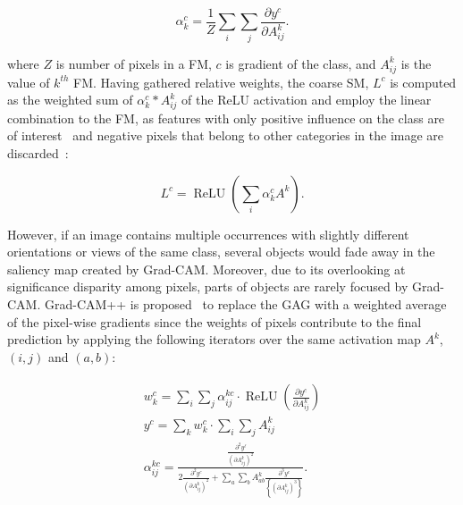 \vspace{-4mm}
\begin{equation}
    \alpha_k^c=\frac{1}{Z}\sum_{i}\sum_{j}\frac{\partial y^c}{\partial A_{ij}^k}.
    \label{eq:alpha}
\end{equation}
\vspace{-4mm}

\hspace*{3.5mm} where $Z$ is number of pixels in a FM, $c$ is gradient of the class, and $A_{ij}^k$ is the value of $k^{th}$ FM. Having gathered relative weights, the coarse SM, $L^c$ is computed as the weighted sum of $\alpha_k^c*A_{ij}^k$ of the ReLU activation and employ the linear combination to the FM, as features with only positive influence on the class are of interest~\cite{chattopadhay2018grad} and negative pixels that belong to other categories in the image are discarded~\cite{114}:

\vspace{-4mm}
\begin{equation}
    L^c=\operatorname{ReLU}(\sum_{i}\alpha_k^cA^k).
    \label{3.11}
\end{equation}
\vspace{-4mm}

\hspace*{3.5mm} However, if an image contains multiple occurrences with slightly different orientations or views of the same class, several objects would fade away in the saliency map created by Grad-CAM. Moreover, due to its overlooking at significance disparity among pixels, parts of objects are rarely focused by Grad-CAM. Grad-CAM++ is proposed~\cite{chattopadhay2018grad} to replace the GAG with a weighted average of the pixel-wise gradients since the weights of pixels contribute to the final prediction by applying the following iterators over the same activation map $A^k$, $(i,j)$ and $(a,b)$:

\vspace{-4mm}
\begin{align}
    \begin{aligned}
        w_{k}^{c}=\sum_{i} \sum_{j} \alpha_{i j}^{k c} \cdot \operatorname{ReLU}\left(\frac{\partial y^{c}}{\partial A_{i j}^{k}}\right) \\
        y^{c}=\sum_{k} w_{k}^{c} \cdot \sum_{i} \sum_{j} A_{i j}^{k} \\
        \alpha_{i j}^{k c}=\frac{\frac{\partial^{2} y^{\ell}}{\left(\partial A_{i j}^{k}\right)^{2}}}{2 \frac{\partial^{2} y^{c}}{\left(\partial A_{i j}^{k}\right)^{2}}+\sum_{a} \sum_{b} A_{a b}^{k} \frac{\partial^{3} y^{c}}{\left\{\left(\partial A_{i j}^{k}\right)^{3}\right\}}}.
    \end{aligned}
\end{align}

